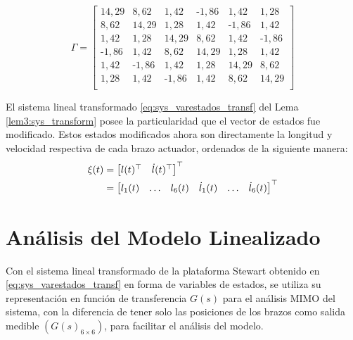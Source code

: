 \begin{equation}
\Gamma = \begin{bmatrix}
    14,29 &	8,62 &	1,42 &	\textrm{-}1,86 &	1,42 &	1,28 \\
    8,62 &	14,29 &	1,28 &	1,42 &	\textrm{-}1,86 &	1,42 \\
    1,42 &	1,28 &	14,29 &	8,62 &	1,42 &	\textrm{-}1,86 \\
    \textrm{-}1,86 &	1,42 &	8,62 &	14,29 &	1,28 &	1,42 \\
    1,42 &	\textrm{-}1,86 &	1,42 &	1,28 &	14,29 &	8,62 \\
    1,28 &	1,42 &	\textrm{-}1,86 &	1,42 &	8,62 &	14,29 \\
\end{bmatrix}
\end{equation}

\newpage
El sistema lineal transformado \eqref{eq:sys_varestados_transf} del Lema \ref{lem3:sys_transform} posee la particularidad que el vector de estados fue modificado. Estos estados modificados ahora son directamente la longitud y velocidad respectiva de cada brazo actuador, ordenados de la siguiente manera:
        \begin{align} \label{eq:sys_estados}
            \xi (t) & = \begin{bmatrix}
                l(t)^{\top} & \dot{l}(t)^{\top}
            \end{bmatrix}^{\top} \notag \\
            & = \begin{bmatrix}
                l_1(t) & \hdots & l_6(t) & \dot{l}_1(t) & \hdots & \dot{l}_6(t)
            \end{bmatrix}^{\top}
        \end{align}


\section{Análisis del Modelo Linealizado}

Con el sistema lineal transformado de la plataforma Stewart obtenido en \ref{eq:sys_varestados_transf} en forma de variables de estados, se utiliza su representación en función de transferencia $G(s)$ para el análisis MIMO del sistema, con la diferencia de tener solo las posiciones de los brazos como salida medible $(G(s)_{6\times6})$, para facilitar el análisis del modelo. 

